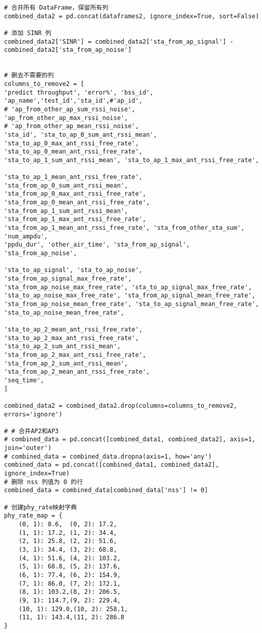 \documentclass[bwprint]{gmcmthesis}
\begin{document}
\begin{lstlisting}
# 合并所有 DataFrame，保留所有列
combined_data2 = pd.concat(dataframes2, ignore_index=True, sort=False)

# 添加 SINR 列
combined_data2['SINR'] = combined_data2['sta_from_ap_signal'] - combined_data2['sta_from_ap_noise']


# 删去不需要的列
columns_to_remove2 = [
'predict throughput', 'error%', 'bss_id', 'ap_name','test_id','sta_id',#'ap_id',
# 'ap_from_other_ap_sum_rssi_noise', 'ap_from_other_ap_max_rssi_noise',
# 'ap_from_other_ap_mean_rssi_noise', 
'sta_id', 'sta_to_ap_0_sum_ant_rssi_mean',
'sta_to_ap_0_max_ant_rssi_free_rate', 'sta_to_ap_0_mean_ant_rssi_free_rate',
'sta_to_ap_1_sum_ant_rssi_mean', 'sta_to_ap_1_max_ant_rssi_free_rate',

'sta_to_ap_1_mean_ant_rssi_free_rate', 'sta_from_ap_0_sum_ant_rssi_mean',
'sta_from_ap_0_max_ant_rssi_free_rate', 'sta_from_ap_0_mean_ant_rssi_free_rate',
'sta_from_ap_1_sum_ant_rssi_mean', 'sta_from_ap_1_max_ant_rssi_free_rate',
'sta_from_ap_1_mean_ant_rssi_free_rate', 'sta_from_other_sta_sum', 'num_ampdu',
'ppdu_dur', 'other_air_time', 'sta_from_ap_signal', 'sta_from_ap_noise',

'sta_to_ap_signal', 'sta_to_ap_noise', 'sta_from_ap_signal_max_free_rate',
'sta_from_ap_noise_max_free_rate', 'sta_to_ap_signal_max_free_rate',
'sta_to_ap_noise_max_free_rate', 'sta_from_ap_signal_mean_free_rate',
'sta_from_ap_noise_mean_free_rate', 'sta_to_ap_signal_mean_free_rate',
'sta_to_ap_noise_mean_free_rate',

'sta_to_ap_2_mean_ant_rssi_free_rate', 'sta_to_ap_2_max_ant_rssi_free_rate',
'sta_to_ap_2_sum_ant_rssi_mean',           
'sta_from_ap_2_max_ant_rssi_free_rate',    
'sta_from_ap_2_sum_ant_rssi_mean',         
'sta_from_ap_2_mean_ant_rssi_free_rate',
'seq_time',
]

combined_data2 = combined_data2.drop(columns=columns_to_remove2, errors='ignore')

# # 合并AP2和AP3
# combined_data = pd.concat([combined_data1, combined_data2], axis=1, join='outer')
# combined_data = combined_data.dropna(axis=1, how='any')
combined_data = pd.concat([combined_data1, combined_data2], ignore_index=True)
# 删除 nss 列值为 0 的行
combined_data = combined_data[combined_data['nss'] != 0]

# 创建phy_rate映射字典
phy_rate_map = {
	(0, 1): 8.6,  (0, 2): 17.2,
	(1, 1): 17.2, (1, 2): 34.4,
	(2, 1): 25.8, (2, 2): 51.6,
	(3, 1): 34.4, (3, 2): 68.8,
	(4, 1): 51.6, (4, 2): 103.2,
	(5, 1): 68.8, (5, 2): 137.6,
	(6, 1): 77.4, (6, 2): 154.9,
	(7, 1): 86.0, (7, 2): 172.1,
	(8, 1): 103.2,(8, 2): 206.5,
	(9, 1): 114.7,(9, 2): 229.4,
	(10, 1): 129.0,(10, 2): 258.1,
	(11, 1): 143.4,(11, 2): 286.8
}


\end{lstlisting}
\end{document}
